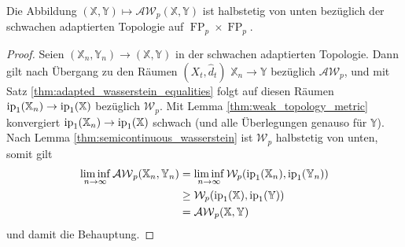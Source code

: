 \begin{lemma}%
    Die Abbildung $(\mathbb{X,Y}) \mapsto \mathcal{AW}_p(\mathbb{X,Y})$ ist halbstetig von unten bezüglich der schwachen adaptierten Topologie auf $\operatorname{FP}_p\times \operatorname{FP}_p$.
\end{lemma}
\begin{proof}
    Seien $(\mathbb{X}_n, \mathbb{Y}_n) \rightarrow (\mathbb{X,Y})$ in der schwachen adaptierten Topologie. Dann gilt nach Übergang zu den Räumen $(X_t, \widehat{d}_t)$ $\mathbb{X}_n \rightarrow \mathbb{Y}$ bezüglich $\mathcal{AW}_p$, und mit Satz \ref{thm:adapted_wasserstein_equalities} folgt auf diesen Räumen $\operatorname{ip}_1(\mathbb{X}_n) \rightarrow \operatorname{ip}_1(\mathbb{X})$ bezüglich $\mathcal{W}_p$. Mit Lemma \ref{thm:weak_topology_metric} konvergiert $\operatorname{ip}_1(\mathbb{X}_n) \rightarrow \operatorname{ip}_1(\mathbb{X})$ schwach (und alle Überlegungen genauso für $\mathbb{Y}$). Nach Lemma \ref{thm:semicontinuous_wasserstein} ist $\mathcal{W}_p$ halbstetig von unten, somit gilt
    \begin{align*}
        \liminf_{n\rightarrow\infty} \mathcal{AW}_p(\mathbb{X}_n,\mathbb{Y}_n) &= \liminf_{n\rightarrow\infty} \mathcal{W}_p(\operatorname{ip}_1(\mathbb{X}_n), \operatorname{ip}_1(\mathbb{Y}_n)) \\
        &\geq \mathcal{W}_p(\operatorname{ip}_1(\mathbb{X}), \operatorname{ip}_1(\mathbb{Y})) \\
        &= \mathcal{AW}_p(\mathbb{X}, \mathbb{Y})
    \end{align*}
    und damit die Behauptung.
\end{proof}
